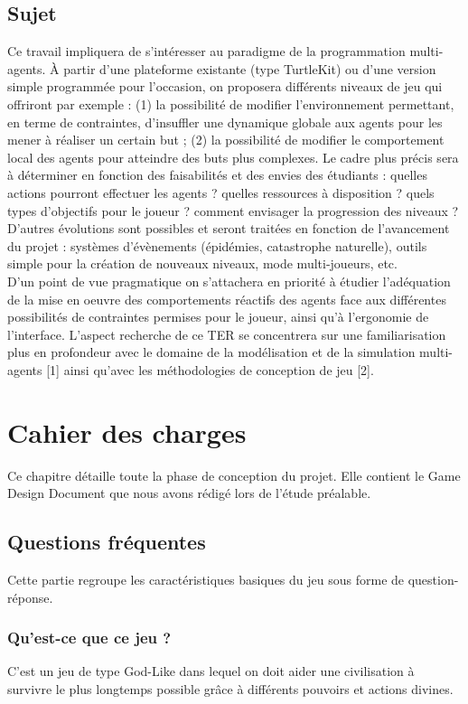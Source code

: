 \documentclass[a4paper]{memoir}
\begin{document}
		\section{Sujet}
			Ce travail impliquera de s’intéresser au paradigme de la programmation multi-agents. À partir d’une plateforme existante (type TurtleKit) ou d’une version simple programmée pour l’occasion, on proposera différents niveaux de jeu qui offriront par exemple : (1) la possibilité de modifier l’environnement permettant, en terme de contraintes, d’insuffler une dynamique globale aux agents pour les mener à réaliser un certain but ; (2) la possibilité de modifier le comportement local des agents pour atteindre des buts plus complexes. 
			Le cadre plus précis sera à déterminer en fonction des faisabilités et des envies des étudiants : quelles actions pourront effectuer les agents ? quelles ressources à disposition ? quels types d’objectifs pour le joueur ? comment envisager la progression des niveaux ? D’autres évolutions sont possibles et seront traitées en fonction de l’avancement du projet : systèmes d’évènements (épidémies, catastrophe naturelle), outils simple pour la création de nouveaux niveaux, mode multi-joueurs, etc. \\
			D’un point de vue pragmatique on s’attachera en priorité à étudier l’adéquation de la mise en oeuvre des comportements réactifs des agents face aux différentes possibilités de contraintes permises pour le joueur, ainsi qu’à l’ergonomie de l’interface. L’aspect recherche de ce TER se concentrera sur une familiarisation plus en profondeur avec le domaine de la modélisation et de la simulation multi-agents [1] ainsi qu’avec les méthodologies de conception de jeu [2].
	
	\chapter{Cahier des charges}
		Ce chapitre détaille toute la phase de conception du projet. Elle contient le Game Design Document que nous avons rédigé lors de l'étude préalable.
	
		\section{Questions fréquentes}
			Cette partie regroupe les caractéristiques basiques du jeu sous forme de question-réponse.
		
			\subsection{Qu'est-ce que ce jeu ?}
				C'est un jeu de type God-Like dans lequel on doit aider une civilisation à survivre le plus longtemps possible grâce à différents pouvoirs et actions divines.
		
\end{document}
